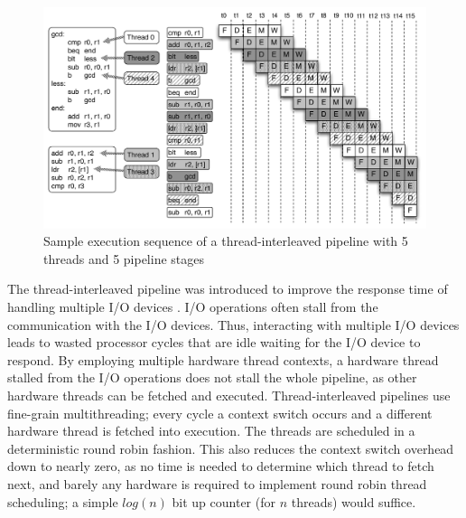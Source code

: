\begin{figure}
  \vspace{-20pt}
  \begin{center}
    \includegraphics[scale=.55]{figs/thread-interleaved-execution}
  \end{center}
  \vspace{-20pt}
  \caption{Sample execution sequence of a thread-interleaved pipeline with 5 threads and 5 pipeline stages}
  \label{fig:execution_thread_interleaved_pipeline}
\end{figure}
The thread-interleaved pipeline was introduced to improve the response time of handling multiple I/O devices .
I/O operations often stall from the communication with the I/O devices.
Thus, interacting with multiple I/O devices leads to wasted processor cycles that are idle waiting for the I/O device to respond.
By employing multiple hardware thread contexts, a hardware thread stalled from the I/O operations does not stall the whole pipeline, as other hardware threads can be fetched and executed.
Thread-interleaved pipelines use fine-grain multithreading; every cycle a context switch occurs and a different hardware thread is fetched into execution. 
The threads are scheduled in a deterministic round robin fashion. 
This also reduces the context switch overhead down to nearly zero, as no time is needed to determine which thread to fetch next, and barely any hardware is required to implement round robin thread scheduling; a simple $log(n)$ bit up counter (for $n$ threads) would suffice.         
